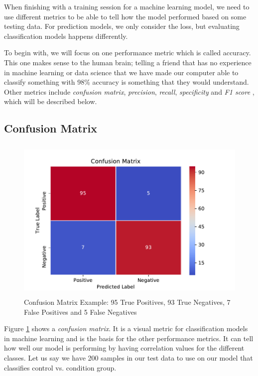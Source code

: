 When finishing with a training session for a machine learning model, we need to use different metrics to be able to tell how the model performed based on some testing data. For prediction models, we only consider the loss, but evaluating classification models happens differently. 

To begin with, we will focus on one performance metric which is called accuracy. This one makes sense to the human brain; telling a friend that has no experience in machine learning or data science that we have made our computer able to classify something with 98\% accuracy is something that they would understand. Other metrics include \textit{confusion matrix}, \textit{precision}, \textit{recall}, \textit{specificity} and \textit{F1 score} \cite{GarciaCeja2018_classification_bipolar}, which will be described below.

\subsection{Confusion Matrix}

\begin{figure}[h]
  \begin{center}
    \includegraphics[height=8cm]{img/conf_matrix.pdf}
    \caption{Confusion Matrix Example: 95 True Positives, 93 True Negatives, 7 False Positives and 5 False Negatives}
    \label{figure:confusion_matrix_bipolar}
  \end{center}
\end{figure}

Figure \ref{figure:confusion_matrix_bipolar} shows a \textit{confusion matrix}. It is a visual metric for classification models in machine learning and is the basis for the other performance metrics. It can tell how well our model is performing by having correlation values for the different classes. Let us say we have 200 samples in our test data to use on our model that classifies control vs. condition group. 

